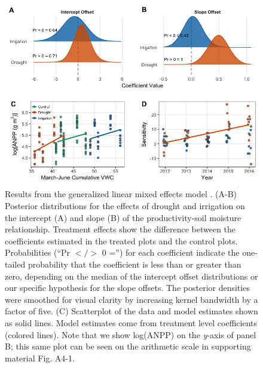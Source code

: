 \documentclass[fleqn,10pt,lineno]{wlpeerj} %
\begin{document}
\begin{figure}[!ht]
  \centering
      \includegraphics[width=5in]{../figures/glmm_main_results.png}
  \caption{Results from the generalized linear mixed effects model . (A-B) Posterior distributions for the effects of drought and irrigation on the intercept (A) and slope (B) of the productivity-soil moisture relationship. Treatment effects show the difference between the coefficients estimated in the treated plots and the control plots. Probabilities (``Pr $</>$ 0 ='') for each coefficient indicate the one-tailed probability that the coefficient is less than or greater than zero, depending on the median of the intercept offset distributions or our specific hypothesis for the slope offsets. The posterior densities were smoothed for visual clarity by increasing kernel bandwidth by a factor of five. (C) Scatterplot of the data and model estimates shown as solid lines. Model estimates come from treatment level coefficients (colored lines). Note that we show log(ANPP) on the \emph{y}-axis of panel B; this same plot can be seen on the arithmetic scale in supporting material Fig. A4-1. }
\end{figure}

\newpage{}
\end{document}
